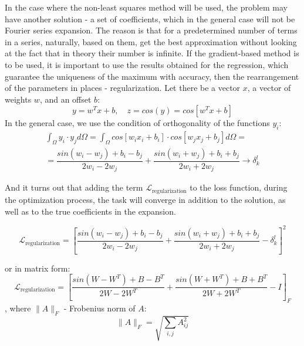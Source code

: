 In the case where the non-least squares method will be used, the problem may have another solution - a set of coefficients, which in the general case will not be Fourier series expansion. The reason is that for a predetermined number of terms in a series, naturally, based on them, get the best approximation without looking at the fact that in theory their number is infinite. If the gradient-based method is to be used, it is important to use the results obtained for the regression, which guarantee the uniqueness of the maximum with accuracy, then the rearrangement of the parameters in places - regularization. Let there be a vector $ x $, a vector of weights $ w $, and an offset $ b $:
\begin{equation*}
	y = w^T x + b, \quad z = cos(y) = cos \left [ w^T x + b \right ]
\end{equation*}
In the general case, we use the condition of orthogonality of the functions $y_i$:
\begin{equation*}
	\begin{split}
		\int_{\Omega} y_i \cdot y_j d\Omega = \int_{\Omega} cos \left [ w_i x_i + b_i \right ] \cdot cos \left [ w_j x_j + b_j \right ] d\Omega = \\[10pt] = \dfrac{sin(w_i - w_j) + b_i - b_j}{2 w_i - 2 w_j} + \dfrac{sin(w_i + w_j) + b_i + b_j}{2 w_i + 2 w_j} \rightarrow \delta_k^l
	\end{split}
\end{equation*}

And it turns out that adding the term $\mathcal{L}_{\text{regularization}}$ to the loss function, during the optimization process, the task will converge in addition to the solution, as well as to the true coefficients in the expansion.

\begin{equation}
	\label{eq:regularization_criterion_fourier}
	\mathcal{L}_{\text{regularization}} = \left [ \dfrac{sin(w_i - w_j) + b_i - b_j}{2 w_i - 2 w_j} + \dfrac{sin(w_i + w_j) + b_i + b_j}{2 w_i + 2 w_j} - \delta_k^l \right ]^2
\end{equation}

or in matrix form:
\begin{equation}
	\label{eq:regularization_criterion_fourier_matrix}
	\mathcal{L}_{\text{regularization}} = \left [ \dfrac{sin(W - W^T) + B - B^T}{2 W - 2 W^T} + \dfrac{sin(W + W^T) + B + B^T}{2 W + 2 W^T} - I \right ]_F
\end{equation}
, where $ \| A \|_F $ - Frobenius norm of $A$:
\begin{equation*}
	 \| A \|_F = \sqrt{ \sum_{i, j} A_{ij}^2 }
\end{equation*}

